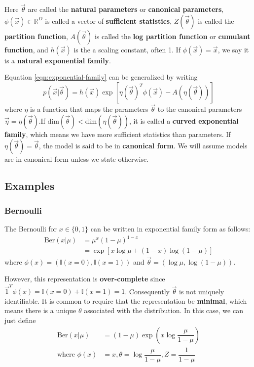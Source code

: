 \begin{refsection}
Here $\vec{\theta}$ are called the \textbf{natural parameters} or \textbf{canonical parameters}, $\phi(\vec{x}) \in \mathbb{R}^D$ is called a vector of \textbf{sufficient statistics}, $Z(\vec{\theta})$ is called the \textbf{partition function}, $A(\vec{\theta})$ is called the \textbf{log partition function} or \textbf{cumulant function}, and $h(\vec{x})$ is the a scaling constant, often 1. If $\phi(\vec{x})=\vec{x}$, we say it is a \textbf{natural exponential family}.

Equation \ref{eqn:exponential-family} can be generalized by writing
\begin{equation}
p(\vec{x}|\vec{\theta}) = h(\vec{x})\exp[\eta(\vec{\theta})^T\phi(\vec{x})-A(\eta(\vec{\theta}))]
\end{equation}
where $\eta$ is a function that maps the parameters $\vec{\theta}$ to the canonical parameters $\vec{\eta}=\eta(\vec{\theta})$.If $\mathrm{dim}(\vec{\theta})<\mathrm{dim}(\eta(\vec{\theta}))$, it is called a \textbf{curved exponential family}, which means we have more sufficient statistics than parameters. If $\eta(\vec{\theta})=\vec{\theta}$, the model is said to be in \textbf{canonical form}. We will assume models are in canonical form unless we state otherwise.


\subsection{Examples}


\subsubsection{Bernoulli}
The Bernoulli for $x \in \{0,1\}$ can be written in exponential family form as follows:
\begin{equation}\begin{split}
\mathrm{Ber}(x|\mu)& =\mu^x(1-\mu)^{1-x} \\
& =\exp[x\log\mu+(1-x)\log(1-\mu)]
\end{split}\end{equation}
where $\phi(x)=(\mathbb{I}(x=0),\mathbb{I}(x=1))$ and $\vec{\theta}=(\log\mu,\log(1-\mu))$. 

However, this representation is \textbf{over-complete} since $\vec{1}^T\phi(x)=\mathbb{I}(x=0)+\mathbb{I}(x=1)=1$. Consequently $\vec{\theta}$ is not uniquely identifiable. It is common to require that the representation be \textbf{minimal}, which means there is a unique $\theta$ associated with the distribution. In this case, we can just define
\begin{align}
\mathrm{Ber}(x|\mu) & =(1-\mu)\exp\left(x\log\dfrac{\mu}{1-\mu}\right) \\
\text{where } \phi(x) & =x, \theta=\log\dfrac{\mu}{1-\mu}, Z=\dfrac{1}{1-\mu}  \nonumber
\end{align}


\end{refsection}
